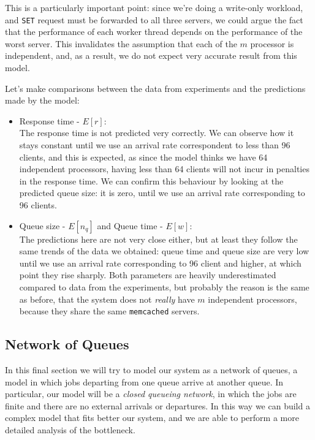 \documentclass[11pt,a4paper]{article}
\renewcommand{\t}[1]{%
	{\texttt{#1}}}
\begin{document}
This is a particularly important point: since we're doing a write-only workload,
and \t{SET} request must be forwarded to all three servers, we could argue the
fact that the performance of each worker thread depends on the performance
of the worst server. This invalidates the assumption that each of the $m$ processor
is independent, and, as a result, we do not expect very accurate result from
this model.

\vspace{1em}

Let's make comparisons between the data from experiments and the predictions made by the model:
\begin{itemize}
	\item Response time - $E[r]$: \\
		The response time is not predicted very correctly. We can observe how it stays constant
		until we use an arrival rate correspondent to less than 96 clients, and this is expected, 
		as since the model thinks we have 64 independent processors, having less than 64 clients
		will not incur in penalties in the response time. We can confirm this behaviour
		by looking at the predicted queue size: it is zero, until we use an arrival rate
		corresponding to 96 clients.

	\item Queue size - $E[n_q]$ \hspace{3em} and \hspace{3em} Queue time - $E[w]$: \\
		The predictions here are not very close either, but at least they
		follow the same trends of the data we obtained: queue time and queue
		size are very low until we use an arrival rate corresponding to 96
		client and higher, at which point they rise sharply. Both parameters
		are heavily underestimated compared to data from the experiments, but
		probably the reason is the same as before, that the system does not
		\emph{really} have $m$ independent processors, because they share
		the same \t{memcached} servers.

\end{itemize}

\subsection{Network of Queues}

In this final section we will try to model our system as a network of queues,
a model in which jobs departing from one queue arrive at another queue.
In particular, our model will be a \emph{closed queueing network}, in which
the jobs are finite and there are no external arrivals or departures.
In this way we can build a complex model that fits better our system, and we are
able to perform a more detailed analysis of the bottleneck.
\end{document}
